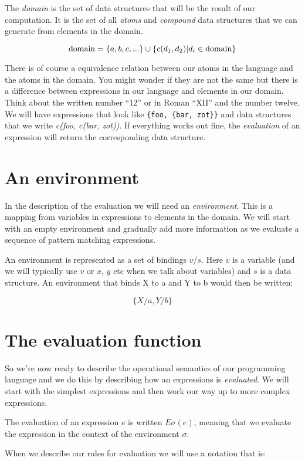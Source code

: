 \documentclass[a4paper,11pt]{article}
\begin{document}
The {\em domain} is the set of data structures that will be the result
of our computation. It is the set of all {\em atoms} and {\em
  compound} data structures that we can generate from elements in the
domain.

$${\rm domain} = \{a,b,c, ...\} \cup \{c(d_1, d_2) | d_i \in {\rm domain}\}$$

There is of course a equivalence relation between our atoms in the
language and the atoms in the domain. You might wonder if they are not
the same but there is a difference between expressions in our language
and elements in our domain. Think about the written number ``12'' or
in Roman ``XII'' and the number twelve. We will have expressions that
look like {\tt \{foo, \{bar, zot\}\}} and data structures that we
write {\em c(foo, c(bar, zot))}. If everything works out fine, the
{\em evaluation} of an expression will return the corresponding data
structure.

\section{An environment}

In the description of the evaluation we will need an {\em
  environment}. This is a mapping from variables in expressions to
elements in the domain. We will start with an empty environment and
gradually add more information as we evaluate a sequence of pattern
matching expressions. 

An environment is represented as a set of bindings $v/s$. Here $v$ is
a variable (and we will typically use $v$ or $x$, $y$ etc when we talk
about variables) and $s$ is a data structure. An environment that
binds X to a and Y to b would then be written:

$$\{X/a, Y/b\}$$


\section{The evaluation function}

So we're now ready to describe the operational semantics of our
programming language and we do this by describing how an expressions is
{\em evaluated}. We will start with the simplest expressions and then
work our way up to more complex expressions.

The evaluation of an expression $e$ is written $E\sigma(e)$, meaning
that we evaluate the expression in the context of the environment $\sigma$.

When we describe our rules for evaluation we will use
 a notation that is:
\end{document}
